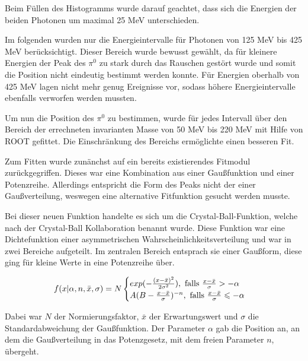 \documentclass[a4paper,11pt,oneside,final,german,openbib,pdftex]{scrbook}
\begin{document}
{Beim Füllen des Histogramms wurde darauf geachtet, dass sich die Energien der beiden Photonen um maximal 25 MeV unterschieden.

Im folgenden wurden nur die Energieintervalle f\"ur Photonen von 125 MeV bis 425 MeV ber\"ucksichtigt.
Dieser Bereich wurde bewusst gew\"ahlt, da f\"ur kleinere Energien der Peak des $\pi^0$ zu stark durch das Rauschen gest\"ort wurde und somit die Position nicht eindeutig bestimmt werden konnte. F\"ur Energien oberhalb von 425 MeV lagen nicht mehr genug Ereignisse vor, sodass h\"ohere Energieintervalle ebenfalls verworfen werden mussten. 


Um nun die Position des $\pi^0$ zu bestimmen, wurde für jedes Intervall über den Bereich der errechneten invarianten Masse von 50 MeV bis 220 MeV mit Hilfe von ROOT gefittet. Die Einschr\"ankung des Bereichs erm\"oglichte einen besseren Fit.



 Zum Fitten wurde zun\"anchst auf ein bereits existierendes Fitmodul zur\"uckgegriffen. Dieses war eine Kombination aus einer Gau{\ss}funktion und einer Potenzreihe. Allerdings entspricht die Form des Peaks nicht der einer Gau{\ss}verteilung, weswegen eine alternative Fitfunktion gesucht werden musste. 
 
 Bei dieser neuen Funktion handelte es sich um die Crystal-Ball-Funktion, welche nach der Crystal-Ball Kollaboration benannt wurde. Diese Funktion war eine Dichtefunktion einer asymmetrischen Wahrscheinlichkeitsverteilung und war in zwei Bereiche aufgeteilt. Im zentralen Bereich entsprach sie einer Gau{\ss}form, diese ging f\"ur kleine Werte in eine Potenzreihe \"uber.
 
 \begin{equation}
 f(x|\alpha,n,\bar{x},\sigma)=N\begin{cases}exp(-\frac{(x-\bar{x})^2}{2\sigma^2}), \textnormal{  falls $\frac{x-\bar{x}}{\sigma}> -\alpha$} \\
 A(B-\frac{x-\bar{x}}{\sigma})^{-n}, \textnormal{  falls $\frac{x-\bar{x}}{\sigma}\leqslant -\alpha$} 
 \end{cases}
 \label{eq:Crystal-Ball-Funktion}
 \end{equation}
 
 Dabei war $N$ der Normierungsfaktor, $\bar{x}$ der Erwartungswert und $\sigma$ die Standardabweichung der Gau{\ss}funktion. Der Parameter $\alpha$ gab die Position an, an dem die Gau{\ss}verteilung in das Potenzgesetz, mit dem freien Parameter $n$, \"ubergeht\cite{NBI15}. 
 
}
\end{document}
